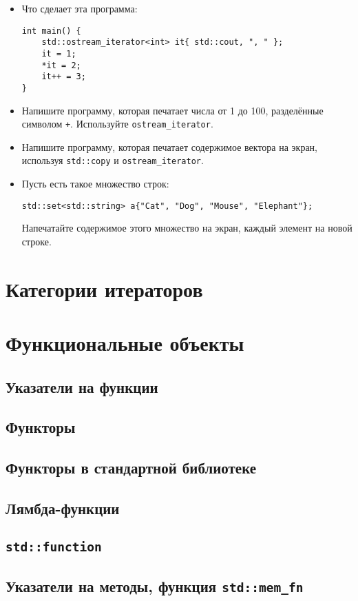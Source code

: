 \documentclass{article}
\begin{document}
\begin{itemize}
\item Что сделает эта программа:
\begin{lstlisting}
int main() {
    std::ostream_iterator<int> it{ std::cout, ", " };
    it = 1;
    *it = 2;
    it++ = 3;
}
\end{lstlisting}
\item Напишите программу, которая печатает числа от 1 до 100, разделённые символом \texttt{+}. Используйте \texttt{ostream\_iterator}.
\item Напишите программу, которая печатает содержимое вектора на экран, используя \texttt{std::copy} и \texttt{ostream\_iterator}.
\item Пусть есть такое множество строк:
\begin{lstlisting}
std::set<std::string> a{"Cat", "Dog", "Mouse", "Elephant"};
\end{lstlisting}
Напечатайте содержимое этого множество на экран, каждый элемент на новой строке.
\end{itemize}



\newpage
\section*{Категории итераторов}

\newpage
\section*{Функциональные объекты}
\subsection*{Указатели на функции}
\subsection*{Функторы}
\subsection*{Функторы в стандартной библиотеке}
\subsection*{Лямбда-функции}
\subsection*{\texttt{std::function}}
\subsection*{Указатели на методы, функция \texttt{std::mem\_fn}}
\end{document}
